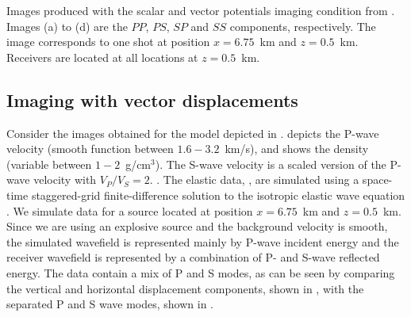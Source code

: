           {Images produced with the scalar and vector potentials
            imaging condition from . Images (a) to (d) are the $PP$, $PS$,
            $SP$ and $SS$ components, respectively.  The image
            corresponds to one shot at position $x=6.75$~km and
            $z=0.5$~km.  Receivers are located at all locations at
            $z=0.5$~km. }
\subsection{Imaging with vector displacements}

Consider the images obtained for the model depicted in
 \geosout{\&} 
.  depicts the P-wave velocity
(smooth function between $1.6-3.2$~km/s), and  shows
the density (variable between $1-2$~g/cm$^3$). The S-wave velocity is
a scaled version of the P-wave velocity with $V_P/V_S=2$.    .  The elastic data,
 \geosout{\&}  , are
simulated using a space-time staggered-grid finite-difference solution
to the isotropic elastic wave equation
\cite[]{GEO49-11-19331942,GEO51-04-08890901,GEO52-09-12111228,GEO53-06-07500759}.
We simulate data for a source located at position $x=6.75$~km and
$z=0.5$~km. Since we are using an explosive source and the background
velocity is smooth, the simulated wavefield is represented mainly by
P-wave incident energy and the receiver wavefield is represented by a
combination of P- and S-wave reflected energy. The data contain a mix
of P and S modes, as can be seen by comparing the vertical and
horizontal displacement components, shown in 
\geosout{\&}  , with the separated P and S
wave modes, shown in  \geosout{\&} 
.


